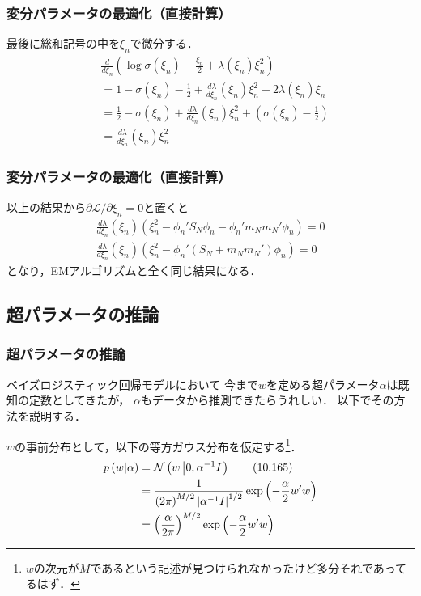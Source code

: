 \documentclass[10pt,hyperref={unicode}]{beamer}
\newcommand{\absolute}[1]{\left|#1\right|}
\newcommand{\parentheses}[1]{\left(#1\right)}
\newcommand{\energy}{\mathcal{L}}
\begin{document}
\begin{frame}
\frametitle{変分パラメータの最適化（直接計算）}
最後に総和記号の中を$\xi_n$で微分する．
\begin{align*}
    &\frac{d}{d\xi_n}
        \parentheses{%
            \log\sigma\parentheses{\xi_n}
            - \frac{\xi_n}{2}
            + \lambda\parentheses{\xi_n}\xi_n^2
        } \\
    &= 1 - \sigma\parentheses{\xi_n} - \frac{1}{2} + \frac{d\lambda}{d\xi_n}\parentheses{\xi_n}\xi_n^2 + 2\lambda\parentheses{\xi_n}\xi_n \\
    &= \frac{1}{2} - \sigma\parentheses{\xi_n} + \frac{d\lambda}{d\xi_n}
            \parentheses{\xi_n}\xi_n^2 + \parentheses{\sigma\parentheses{\xi_n} - \frac{1}{2}} \\
    &= \frac{d\lambda}{d\xi_n}\parentheses{\xi_n}\xi_n^2
\end{align*}
\end{frame}

\begin{frame}
\frametitle{変分パラメータの最適化（直接計算）}
以上の結果から$\partial \energy/\partial \xi_n = 0$と置くと
\begin{gather*}
    \frac{d\lambda}{d\xi_n}
    \parentheses{\xi_n}
    \parentheses{%
        \xi_n^2
        - \phi_n'S_N \phi_n
        - \phi_n'm_Nm_N'\phi_n
    }
    = 0 \\
    \frac{d\lambda}{d\xi_n}
    \parentheses{\xi_n}
    \parentheses{%
        \xi_n^2
        - \phi_n'
        \parentheses{S_N + m_Nm_N'}\phi_n
    }
    = 0
\end{gather*}
となり，EMアルゴリズムと全く同じ結果になる．
\end{frame}

\subsection{超パラメータの推論}
\begin{frame}
\frametitle{超パラメータの推論}
ベイズロジスティック回帰モデルにおいて
今まで$w$を定める超パラメータ$\alpha$は既知の定数としてきたが，
$\alpha$もデータから推測できたらうれしい．
以下でその方法を説明する．

\bigskip

$w$の事前分布として，以下の等方ガウス分布を仮定する\footnote[frame]{$w$の次元が$M$であるという記述が見つけられなかったけど多分それであってるはず．}．
\begin{align}
    p\parentheses{w|\alpha}
    &= \mathcal{N}\parentheses{w\left|0,\alpha^{-1}I\right.} \tag{10.165} \label{pwa} \\
    &= \frac{1}{\parentheses{2\pi}^{M/2}\absolute{\alpha^{-1}I}^{1/2}} \exp\parentheses{-\frac{\alpha}{2}w'w} \notag \\
    &= \parentheses{\frac{\alpha}{2\pi}}^{M/2} \exp\parentheses{-\frac{\alpha}{2}w'w} \notag
\end{align}
\end{frame}
\end{document}
